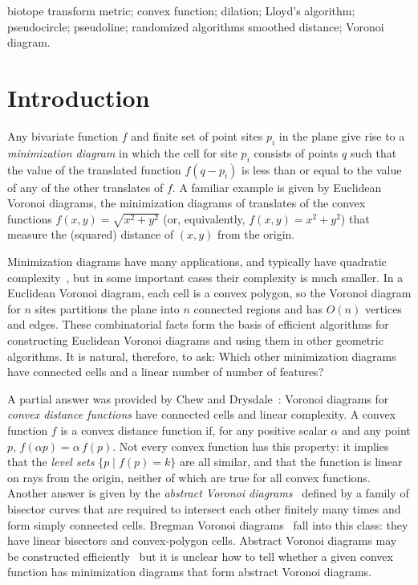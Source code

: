 \documentclass[10pt, conference, compsocconf]{IEEEtran}
\begin{document}
\begin{IEEEkeywords}
biotope transform metric;
convex function; dilation; Lloyd's algorithm;
pseudocircle; pseudoline; randomized algorithms
smoothed distance; Voronoi diagram.
\end{IEEEkeywords}

\section{Introduction}

Any bivariate function $f$ and finite set of point sites $p_i$ in the plane give rise to a \emph{minimization diagram}  in which the cell for site $p_i$ consists of points $q$ such that the value of the translated function $f(q-p_i)$ is less than or equal to the value of any of the other translates of $f$. A familiar example is given by Euclidean Voronoi diagrams, the minimization diagrams of translates of the convex functions $f(x,y)=\sqrt{x^2+y^2}$ (or, equivalently, $f(x,y)=x^2+y^2$) that measure the (squared) distance of $(x,y)$ from the origin.

Minimization diagrams have many applications, and typically have quadratic complexity~\cite{HalSha-DCG-94}, but in some important cases their complexity is much smaller.
In a Euclidean Voronoi diagram, each cell is a convex polygon, so the Voronoi diagram for $n$ sites partitions the plane into $n$ connected regions and has $O(n)$ vertices and edges. These combinatorial facts form the basis of efficient algorithms for constructing Euclidean Voronoi diagrams and using them in other geometric algorithms. It is natural, therefore, to ask: Which other minimization diagrams have connected cells and a linear number of number of features?

A partial answer was provided by Chew and Drysdale~\cite{CheDry-SoCG-85}:  Voronoi diagrams for \emph{convex distance functions} have connected cells and linear complexity. A convex function $f$ is a convex distance function if, for any positive scalar $\alpha$ and any point $p$, $f(\alpha p)=\alpha\,f(p)$. Not every convex function has this property: it implies that the \emph{level sets} $\{p\mid f(p)=k\}$ are all similar, and that the function is linear on rays from the origin, neither of which are true for all convex functions. Another answer is given by the \emph{abstract Voronoi diagrams}~\cite{Kle-89}  defined by a family of bisector curves that are required to intersect each other finitely many times and form simply connected cells. Bregman Voronoi diagrams~\cite{NieBoiNoc-SODA-07} fall into this class: they have linear bisectors and convex-polygon cells. Abstract Voronoi diagrams may be constructed efficiently~\cite{Kle-89,KleMehMei-CGTA-93,MehMeiODu-DCG-91} but it is unclear how to tell whether a given convex function has minimization diagrams that form abstract Voronoi diagrams.
\end{document}
